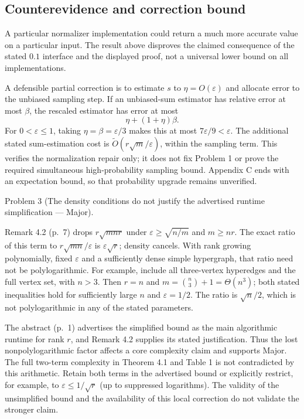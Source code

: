 \documentclass[10pt]{article}
\begin{document}
\subsection*{Counterevidence and correction bound}
A particular normalizer implementation could return a much more accurate value on a particular input. The result above disproves the claimed consequence of the stated \(0.1\) interface and the displayed proof, not a universal lower bound on all implementations.\par
A defensible partial correction is to estimate \(s\) to \(\eta=O(\varepsilon)\) and allocate error to the unbiased sampling step. If an unbiased-sum estimator has relative error at most \(\beta\), the rescaled estimator has error at most \[\eta+(1+\eta)\beta.\] For \(0<\varepsilon\le1\), taking \(\eta=\beta=\varepsilon/3\) makes this at most \(7\varepsilon/9<\varepsilon\). The additional stated sum-estimation cost is \(\widetilde O(r\sqrt m/\varepsilon)\), within the sampling term. This verifies the normalization repair only; it does not fix Problem 1 or prove the required simultaneous high-probability sampling bound. Appendix C ends with an expectation bound, so that probability upgrade remains unverified.\par
Problem 3 (The density conditions do not justify the advertised runtime simplification — Major).\par
Remark 4.2 (p. 7) drops \(r\sqrt{mnr}\) under \(\varepsilon\ge\sqrt{n/m}\) and \(m\ge nr\). The exact ratio of this term to \(r\sqrt{mn}/\varepsilon\) is \(\varepsilon\sqrt r\); density cancels. With rank growing polynomially, fixed \(\varepsilon\) and a sufficiently dense simple hypergraph, that ratio need not be polylogarithmic. For example, include all three-vertex hyperedges and the full vertex set, with \(n>3\). Then \(r=n\) and \(m=\binom n3+1=\Theta(n^3)\); both stated inequalities hold for sufficiently large \(n\) and \(\varepsilon=1/2\). The ratio is \(\sqrt n/2\), which is not polylogarithmic in any of the stated parameters.\par
The abstract (p. 1) advertises the simplified bound as the main algorithmic runtime for rank \(r\), and Remark 4.2 supplies its stated justification. Thus the lost nonpolylogarithmic factor affects a core complexity claim and supports Major. The full two-term complexity in Theorem 4.1 and Table 1 is not contradicted by this arithmetic. Retain both terms in the advertised bound or explicitly restrict, for example, to \(\varepsilon\le1/\sqrt r\) (up to suppressed logarithms). The validity of the unsimplified bound and the availability of this local correction do not validate the stronger claim.\par
\end{document}
